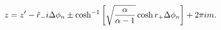 \begin{equation} \label{esingz}
z = z' - \tilde{r}_- i \Delta \phi_n \pm \cosh^{-1} \left[ \sqrt{
\alpha \over \alpha-1} \cosh r_+ \Delta \phi_n \right] + 2\pi i m.
\end{equation}


